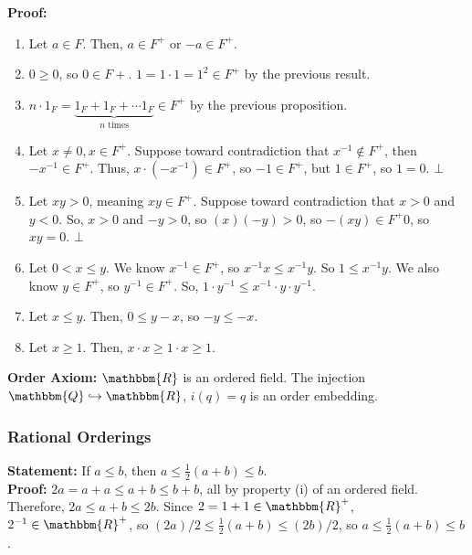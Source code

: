 \documentclass[10pt]{extarticle}
\newcommand{\Q}{\mathbbm{Q}}
\newcommand{\R}{\mathbbm{R}}
\begin{document}
    \textbf{Proof:}
      \begin{enumerate}[(1)]
        \item Let $a\in F$. Then, $a\in F^+$ or $-a\in F^+$.
        \item $0\geq 0$, so $0\in F+$. $1 = 1\cdot 1 = 1^2 \in F^+$ by the previous result.
        \item $n\cdot 1_F = \underbrace{1_F + 1_F + \cdots 1_F}_{\text{$n$ times}}\in F^+$ by the previous proposition.
        \item Let $x\neq 0, x\in F^+$. Suppose toward contradiction that $x^{-1}\notin F^+$, then $-x^{-1}\in F^+$. Thus, $x\cdot(-x^{-1})\in F^+$, so $-1\in F^+$, but $1\in F^+$, so $1 = 0$. $\bot$
        \item Let $xy > 0$, meaning $xy\in F^+$. Suppose toward contradiction that $x>0$ and $y<0$. So, $x>0$ and $-y > 0$, so $(x)(-y) > 0$, so $-(xy) \in F^+ 0$, so $xy = 0$. $\bot$
        \item Let $0 < x \leq y$. We know $x^{-1}\in F^+$, so $x^{-1}x \leq x^{-1}y$. So $1\leq x^{-1}y$. We also know $y\in F^+$, so $y^{-1}\in F^+$. So, $1\cdot y^{-1}\leq x^{-1}\cdot y\cdot y^{-1}$. 
        \item Let $x\leq y$. Then, $0\leq y-x$, so $-y\leq -x$.
        \item Let $x\geq 1$. Then, $x\cdot x \geq 1\cdot x \geq 1$.
      \end{enumerate}
    \textbf{Order Axiom:} $\R$ is an ordered field. The injection $\Q\hookrightarrow \R$, $i(q) = q$ is an order embedding.
    \subsubsection{Rational Orderings}%
    \textbf{Statement:} If $a\leq b$, then $a\leq \frac{1}{2}(a+b) \leq b$.\\

    \textbf{Proof:} $2a = a+a \leq a+b \leq b+b$, all by property (i) of an ordered field.\\

      Therefore, $2a \leq a+b \leq 2b$. Since $2 = 1+1 \in \R^+$, $2^{-1}\in \R^+$, so $(2a)/2 \leq \frac{1}{2}(a+b) \leq (2b)/2$, so $a\leq \frac{1}{2}(a+b) \leq b$.\\
\end{document}
